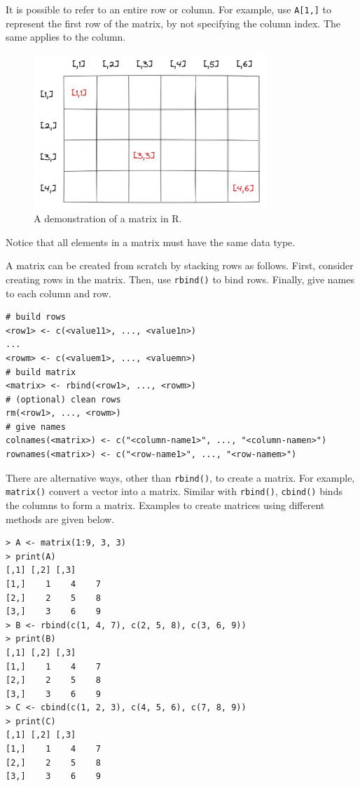 It is possible to refer to an entire row or column. For example, use \verb|A[1,]| to represent the first row of the matrix, by not specifying the column index. The same applies to the column.

\begin{figure}
	\centering
	\includegraphics[width=250pt]{chapters/ch-r/figures/r_table_demo.png}
	\caption{A demonstration of a matrix in R.} \label{ch:r1:fig:r_table_demo}
\end{figure}

Notice that all elements in a matrix must have the same data type.

A matrix can be created from scratch by stacking rows as follows. First, consider creating rows in the matrix. Then, use \verb|rbind()| to bind rows. Finally, give names to each column and row.
\begin{lstlisting}
# build rows
<row1> <- c(<value11>, ..., <value1n>)
...
<rowm> <- c(<valuem1>, ..., <valuemn>)
# build matrix
<matrix> <- rbind(<row1>, ..., <rowm>)
# (optional) clean rows
rm(<row1>, ..., <rowm>)
# give names
colnames(<matrix>) <- c("<column-name1>", ..., "<column-namen>")
rownames(<matrix>) <- c("<row-name1>", ..., "<row-namem>")
\end{lstlisting}

There are alternative ways, other than \verb|rbind()|, to create a matrix. For example, \verb|matrix()| convert a vector into a matrix. Similar with \verb|rbind()|, \verb|cbind()| binds the columns to form a matrix. Examples to create matrices using different methods are given below.
\begin{lstlisting}
> A <- matrix(1:9, 3, 3)
> print(A)
[,1] [,2] [,3]
[1,]    1    4    7
[2,]    2    5    8
[3,]    3    6    9
> B <- rbind(c(1, 4, 7), c(2, 5, 8), c(3, 6, 9))
> print(B)
[,1] [,2] [,3]
[1,]    1    4    7
[2,]    2    5    8
[3,]    3    6    9
> C <- cbind(c(1, 2, 3), c(4, 5, 6), c(7, 8, 9))
> print(C)
[,1] [,2] [,3]
[1,]    1    4    7
[2,]    2    5    8
[3,]    3    6    9
\end{lstlisting}

